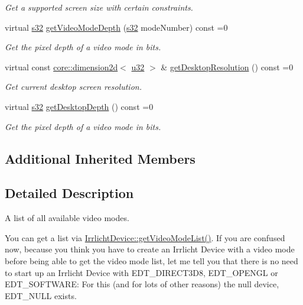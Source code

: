 \begin{DoxyCompactItemize}
\begin{DoxyCompactList}\small\item\em Get a supported screen size with certain constraints. \end{DoxyCompactList}\item 
virtual \hyperlink{namespaceirr_ac66849b7a6ed16e30ebede579f9b47c6}{s32} \hyperlink{classirr_1_1video_1_1IVideoModeList_ae3f4b101eacbebe78d6a2e1a3f2e713d}{get\+Video\+Mode\+Depth} (\hyperlink{namespaceirr_ac66849b7a6ed16e30ebede579f9b47c6}{s32} mode\+Number) const =0
\begin{DoxyCompactList}\small\item\em Get the pixel depth of a video mode in bits. \end{DoxyCompactList}\item 
virtual const \hyperlink{classirr_1_1core_1_1dimension2d}{core\+::dimension2d}$<$ \hyperlink{namespaceirr_a0416a53257075833e7002efd0a18e804}{u32} $>$ \& \hyperlink{classirr_1_1video_1_1IVideoModeList_ade99f99922307c1d539bdd35834361fa}{get\+Desktop\+Resolution} () const =0
\begin{DoxyCompactList}\small\item\em Get current desktop screen resolution. \end{DoxyCompactList}\item 
virtual \hyperlink{namespaceirr_ac66849b7a6ed16e30ebede579f9b47c6}{s32} \hyperlink{classirr_1_1video_1_1IVideoModeList_a15869ac6919f6f29d2a25fcf13b6dd45}{get\+Desktop\+Depth} () const =0
\begin{DoxyCompactList}\small\item\em Get the pixel depth of a video mode in bits. \end{DoxyCompactList}\end{DoxyCompactItemize}
\subsection*{Additional Inherited Members}


\subsection{Detailed Description}
A list of all available video modes. 

You can get a list via \hyperlink{classirr_1_1IrrlichtDevice_a8872867a5ad728a4673679e9e8f469e7}{Irrlicht\+Device\+::get\+Video\+Mode\+List()}. If you are confused now, because you think you have to create an Irrlicht Device with a video mode before being able to get the video mode list, let me tell you that there is no need to start up an Irrlicht Device with E\+D\+T\+\_\+\+D\+I\+R\+E\+C\+T3\+D8, E\+D\+T\+\_\+\+O\+P\+E\+N\+GL or E\+D\+T\+\_\+\+S\+O\+F\+T\+W\+A\+RE\+: For this (and for lots of other reasons) the null device, E\+D\+T\+\_\+\+N\+U\+LL exists. 

